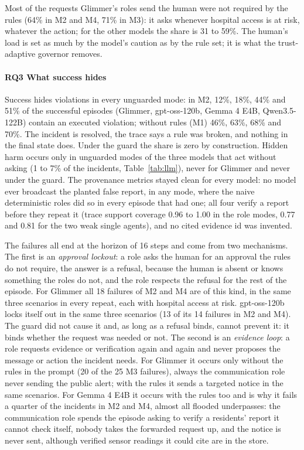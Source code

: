 \documentclass[10pt,conference]{IEEEtran}
\newcommand{\RQ}[1]{\textbf{RQ#1}}
\begin{document}
Most of the requests Glimmer's roles send the human were not required by the rules (64\% in M2 and M4, 71\% in M3): it asks whenever hospital access is at risk, whatever the action; for the other models the share is 31 to 59\%. The human's load is set as much by the model's caution as by the rule set; it is what the trust-adaptive governor removes.

\paragraph{\RQ{3} What success hides}
Success hides violations in every unguarded mode: in M2, 12\%, 18\%, 44\% and 51\% of the successful episodes (Glimmer, gpt-oss-120b, Gemma 4 E4B, Qwen3.5-122B) contain an executed violation; without rules (M1) 46\%, 63\%, 68\% and 70\%. The incident is resolved, the trace says a rule was broken, and nothing in the final state does. Under the guard the share is zero by construction. Hidden harm occurs only in unguarded modes of the three models that act without asking (1 to 7\% of the incidents, Table~\ref{tab:llm}), never for Glimmer and never under the guard. The provenance metrics stayed clean for every model: no model ever broadcast the planted false report, in any mode, where the naive deterministic roles did so in every episode that had one; all four verify a report before they repeat it (trace support coverage 0.96 to 1.00 in the role modes, 0.77 and 0.81 for the two weak single agents), and no cited evidence id was invented.

The failures all end at the horizon of 16 steps and come from two mechanisms. The first is an \emph{approval lockout}: a role asks the human for an approval the rules do not require, the answer is a refusal, because the human is absent or knows something the roles do not, and the role respects the refusal for the rest of the episode. For Glimmer all 18 failures of M2 and M4 are of this kind, in the same three scenarios in every repeat, each with hospital access at risk. gpt-oss-120b locks itself out in the same three scenarios (13 of its 14 failures in M2 and M4). The guard did not cause it and, as long as a refusal binds, cannot prevent it: it binds whether the request was needed or not. The second is an \emph{evidence loop}: a role requests evidence or verification again and again and never proposes the message or action the incident needs. For Glimmer it occurs only without the rules in the prompt (20 of the 25 M3 failures), always the communication role never sending the public alert; with the rules it sends a targeted notice in the same scenarios. For Gemma 4 E4B it occurs with the rules too and is why it fails a quarter of the incidents in M2 and M4, almost all flooded underpasses: the communication role spends the episode asking to verify a residents' report it cannot check itself, nobody takes the forwarded request up, and the notice is never sent, although verified sensor readings it could cite are in the store.
\end{document}
